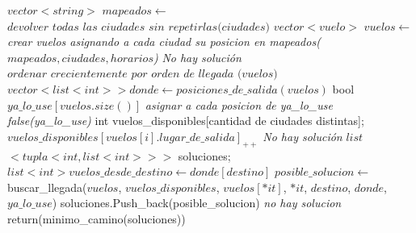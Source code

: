 \documentclass{article}
\begin{document}
 
\vspace{0.4cm}
\begin{algorithmic}[1]
        \State $vector<string>$ $mapeados \gets$ $\textit{devolver todas las ciudades sin repetirlas(ciudades)}$
        \State $vector<vuelo>$ $vuelos\gets$ \textit{crear vuelos asignando a cada ciudad su posicion en mapeados($mapeados, ciudades, horarios$)}
        		\State \textit{No hay solución}
        	\Else 
        		\State $\textit{ordenar crecientemente por orden de llegada (vuelos)}$
        		\State $vector <list <int> > donde \gets posiciones\_de\_salida(vuelos)$
			\State bool $ya\_lo\_use[vuelos.size()]$ 
			\State \textit{asignar a cada posicion de ya\_lo\_use false(ya\_lo\_use)}       		
        		\State int vuelos\_disponibles[cantidad de ciudades distintas];
        			\State $vuelos\_disponibles[vuelos[i].lugar\_de\_salida]_{++}$
        		\EndFor	
        			\State \textit{No hay solución}
        		\Else	
       			\State $list$ $<tupla<int, list<int> > >$ soluciones; 
				\State $list<int> vuelos\_desde\_destino \gets donde[destino]$ 		
					\State $posible\_solucion\gets$ buscar\_llegada($vuelos$, $vuelos\_disponibles$, $vuelos[*it]$, $*it$,  $destino$, $donde$, $ya\_lo\_use$)
					\State soluciones.Push\_back(posible\_solucion)
				\EndFor
					\State \textit{no hay solucion}
				\Else
					\State return(minimo\_camino(soluciones))
				\EndIf
			\EndIf
		 \EndIf			 	
\EndProcedure
\end{algorithmic}
\end{document}
